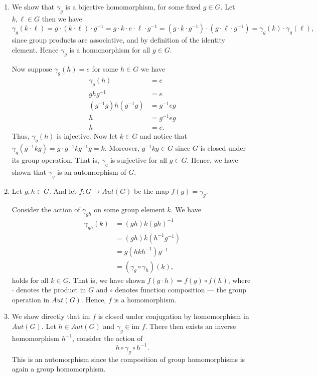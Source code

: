 \documentclass[12pt,letterpaper,boxed]{hmcpset}
\newcommand{\im}{\text{im }}
\newcommand{\inv}{^{-1}}
\begin{document}
\begin{solution}
\begin{enumerate}
	\item We show that $\gamma_g$ is a bijective homomorphism, for
	some fixed $g \in G$.
	Let $k, \ell \in G$ then we have \[
	\gamma_g(k \cdot \ell) = g \cdot
	(k \cdot \ell) \cdot g\inv = g \cdot k \cdot e \cdot \ell \cdot
	g\inv = (g \cdot k \cdot g\inv) \cdot (g \cdot \ell \cdot g\inv) =
	\gamma_g(k) \cdot \gamma_g(\ell),
	\]
	since group products are associative, and by definition of the
	identity element. Hence $\gamma_g$ is a homomorphism for all $g
	\in G$.

	Now suppose $\gamma_g(h) = e$ for some $h \in G$ we have 
	\begin{align*}
		\gamma_g(h) &= e \\
		ghg\inv &= e \\
		(g\inv g)h(g\inv g) &= g\inv e g\\
		h &= g\inv e g \\ 
		h &= e.
	\end{align*} 
	Thus, $\gamma_g(h)$ is injective. Now let $k \in G$ and notice
	that $\gamma_g(g\inv k g) = g\cdot g\inv k g\inv g = k$. Moreover,
	$g\inv k g \in G$ since $G$ is closed under its group operation.
	That is, $\gamma_g$ is surjective for all $g \in G$.
	Hence, we have shown that $\gamma_g$ is an automorphism of $G$.

	\item Let $g,h \in G$.
	And let $f: G \to Aut(G)$ be the map $f(g)
	= \gamma_g$. 
	
	Consider the action of $\gamma_{gh}$ on
	some group element $k$. We have
	\begin{align*}
		\gamma_{gh}(k) &= (gh) k (gh)\inv \\
			&= (gh) k (h\inv g\inv) \\ 
			&= g (h k h\inv) g\inv \\
			&= (\gamma_g \circ \gamma_h)(k),
	\end{align*}
	holds for all $k \in G$. That is, we have shown $f(g \cdot h) = f(g)
	\circ f(h)$, where $\cdot$ denotes the product in $G$ and $\circ$
	denotes function composition --- the group operation in $Aut(G)$.
	Hence, $f$ is a homomorphism.

	\item We show directly that $\im f$ is closed under conjugation by
	homomorphism in $Aut(G)$. Let $h \in Aut(G)$ and $\gamma_g \in \im
	f$. There then exists an
	inverse homomorphism $h\inv$, consider the action of \[
		h \circ \gamma_g \circ h\inv.
	\]
	This is an automorphism since the composition of group
	homomorphisms is again a group homomorphism.


\end{enumerate}
\end{solution}
\end{document}
